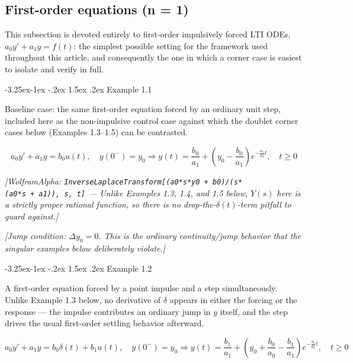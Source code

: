 \documentclass[
  11pt,
]{article}
\makeatletter
\providecommand{\implies}{\Longrightarrow}
\renewcommand\paragraph{\@startsection{paragraph}{4}{\z@}%
                                     {-3.25ex\@plus -1ex \@minus -.2ex}%
                                     {1.5ex \@plus .2ex}%
                                     {\normalfont\normalsize\bfseries}}
\makeatother
\begin{document}
\hypertarget{extended-n1}{%
\subsection{First-order equations (n = 1)}\label{extended-n1}}

This subsection is devoted entirely to first-order impulsively forced
LTI ODEs, \(a_0 y' + a_1 y = f(t)\): the simplest possible setting for
the framework used throughout this article, and consequently the one in
which a corner case is easiest to isolate and verify in full.

\hypertarget{example-1.1}{%
\paragraph{Example 1.1}\label{example-1.1}}

Baseline case: the same first-order equation forced by an ordinary unit
step, included here as the non-impulsive control case against which the
doublet corner cases below (Examples 1.3--1.5) can be contrasted.

\[
a_0 y' + a_1 y = b_0 u(t), \quad y(0^-) = y_0 \implies y(t) = \frac{b_0}{a_1} + \left(y_0 - \frac{b_0}{a_1}\right) e^{-\frac{a_1}{a_0} t}, \quad t \geq 0
\]

\emph{{[}WolframAlpha:
\texttt{InverseLaplaceTransform{[}(a0*s*y0\ +\ b0)/(s*(a0*s\ +\ a1)),\ s,\ t{]}}
--- Unlike Examples 1.3, 1.4, and 1.5 below, \(Y(s)\) here is a strictly
proper rational function, so there is no drop-the-\(\delta(t)\)-term
pitfall to guard against.{]}}

\emph{{[}Jump condition: \(\Delta y_0 = 0\). This is the ordinary
continuity/jump behavior that the singular examples below deliberately
violate.{]}}

\hypertarget{example-1.2}{%
\paragraph{Example 1.2}\label{example-1.2}}

A first-order equation forced by a point impulse and a step
simultaneously. Unlike Example 1.3 below, no derivative of \(\delta\)
appears in either the forcing or the response --- the impulse
contributes an ordinary jump in \(y\) itself, and the step drives the
usual first-order settling behavior afterward.

\[
a_0 y' + a_1 y = b_0 \delta(t) + b_1 u(t), \quad y(0^-) = y_0 \implies y(t) = \frac{b_1}{a_1} + \left(y_0 + \frac{b_0}{a_0} - \frac{b_1}{a_1}\right) e^{-\frac{a_1}{a_0} t}, \quad t \geq 0
\]
\end{document}
